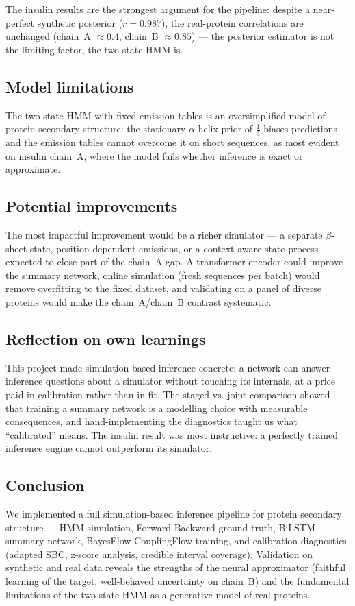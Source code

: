 \documentclass[12pt]{article}
\begin{document}
The insulin results are the strongest argument for the pipeline: despite a
near-perfect synthetic posterior ($r=0.987$), the real-protein correlations
are unchanged (chain~A $\approx 0.4$, chain~B $\approx 0.85$) --- the
posterior estimator is not the limiting factor, the two-state HMM is.

\subsection{Model limitations}

The two-state HMM with fixed emission tables is an oversimplified model of
protein secondary structure: the stationary $\alpha$-helix prior of $\tfrac{1}{3}$
biases predictions and the emission tables cannot overcome it
on short sequences, as most evident on insulin chain~A, where the model fails
whether inference is exact or approximate.

\subsection{Potential improvements}

The most impactful improvement would be a richer simulator --- a separate
$\beta$-sheet state, position-dependent emissions, or a context-aware state
process --- expected to close part of the chain~A gap. A transformer encoder
could improve the summary network, online
simulation (fresh sequences per batch) would remove overfitting to the fixed
dataset, and validating on a panel of
diverse proteins would make the chain~A/chain~B contrast systematic.

\subsection{Reflection on own learnings}

This project made simulation-based inference concrete: a network can answer
inference questions about a simulator without touching its internals, at a
price paid in calibration rather than in fit. The staged-vs.-joint comparison
showed that training a summary network is a modelling choice with measurable
consequences, and hand-implementing the diagnostics taught us what
``calibrated'' means. The
insulin result was most instructive: a
perfectly trained inference engine cannot outperform its simulator.

\subsection{Conclusion}

We implemented a full simulation-based inference pipeline for protein
secondary structure --- HMM simulation, Forward-Backward ground truth, BiLSTM
summary network, BayesFlow CouplingFlow training, and calibration
diagnostics (adapted SBC, z-score analysis, credible interval coverage).
Validation on synthetic and real data reveals the strengths of the neural
approximator (faithful learning of the target, well-behaved uncertainty on
chain~B) and the fundamental limitations of the two-state HMM as a generative model of
real proteins.


\printbibliography
\end{document}

